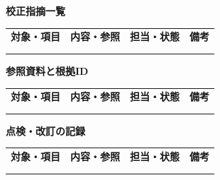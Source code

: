 \documentclass[11pt,a4paper]{article}
\begin{document}
\par{}\noindent\textbf{校正指摘一覧}\par\vspace{1mm}
{\fontsize{8.5}{13}\selectfont
\begin{tabularx}{\linewidth}{@{}XXXX@{}}
\textbf{対象・項目} & \textbf{内容・参照} & \textbf{担当・状態} & \textbf{備考}\\[2mm]
\strut & \strut & \strut & \strut\\[5mm]
\strut & \strut & \strut & \strut\\[5mm]
\end{tabularx}
}\vspace{2mm}\par
{}
\par{}\noindent\textbf{参照資料と根拠ID}\par\vspace{1mm}
{\fontsize{8.5}{13}\selectfont
\begin{tabularx}{\linewidth}{@{}XXXX@{}}
\textbf{対象・項目} & \textbf{内容・参照} & \textbf{担当・状態} & \textbf{備考}\\[2mm]
\strut & \strut & \strut & \strut\\[5mm]
\strut & \strut & \strut & \strut\\[5mm]
\end{tabularx}
}\vspace{2mm}\par
{}
\par{}\noindent\textbf{点検・改訂の記録}\par\vspace{1mm}
{\fontsize{8.5}{13}\selectfont
\begin{tabularx}{\linewidth}{@{}XXXX@{}}
\textbf{対象・項目} & \textbf{内容・参照} & \textbf{担当・状態} & \textbf{備考}\\[2mm]
\strut & \strut & \strut & \strut\\[5mm]
\strut & \strut & \strut & \strut\\[5mm]
\end{tabularx}
}\vspace{2mm}\par
\end{document}

